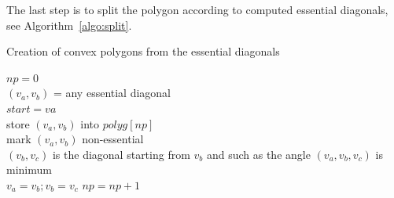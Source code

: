 The last step is to split the polygon according to computed essential
diagonals, see Algorithm~\ref{algo:split}.

\begin{algorithm}
  \caption{Creation of convex polygons from the essential diagonals}

  \label{algo:split}
$np=0$\\
{ $(v_a,v_b)$ = any  essential diagonal\\
$start = va$\\
{store $(v_a,v_b)$ into $polyg[np]$\\
mark $(v_a,v_b)$ non-essential\\
$(v_b,v_c)$ is the diagonal starting from $v_b$ and such as the angle
$(v_a,v_b,v_c)$ is minimum\\
$v_a=v_b; v_b=v_c$
}
$np=np+1$
}
\end{algorithm}


